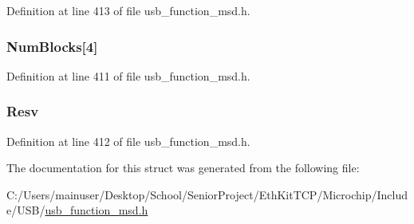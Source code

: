 Definition at line 413 of file usb\+\_\+function\+\_\+msd.\+h.

\hypertarget{structt_block_descriptor_a2adf3263d8a2b010e845443afec9a415}{}
\subsubsection[{Num\+Blocks}]{ Num\+Blocks\mbox{[}4\mbox{]}}\label{structt_block_descriptor_a2adf3263d8a2b010e845443afec9a415}


Definition at line 411 of file usb\+\_\+function\+\_\+msd.\+h.

\hypertarget{structt_block_descriptor_ae3da246d6e0668c91c5eef028d1b30c0}{}
\subsubsection[{Resv}]{ Resv}\label{structt_block_descriptor_ae3da246d6e0668c91c5eef028d1b30c0}


Definition at line 412 of file usb\+\_\+function\+\_\+msd.\+h.



The documentation for this struct was generated from the following file\+:\begin{DoxyCompactItemize}
\item 
C\+:/\+Users/mainuser/\+Desktop/\+School/\+Senior\+Project/\+Eth\+Kit\+T\+C\+P/\+Microchip/\+Include/\+U\+S\+B/\hyperlink{usb__function__msd_8h}{usb\+\_\+function\+\_\+msd.\+h}\end{DoxyCompactItemize}

